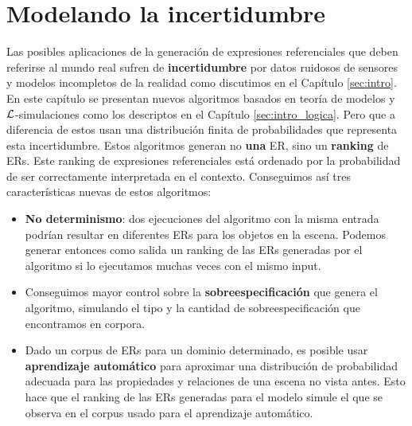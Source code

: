 \chapter{Modelando la incertidumbre}
\label{sec:algoritmo}
 Las posibles aplicaciones de la generaci\'on de expresiones referenciales que deben referirse al mundo real sufren de \textbf{incertidumbre} por datos ruidosos de sensores y modelos incompletos de la realidad como discutimos en el Cap\'itulo \ref{sec:intro}.
En este cap\'itulo se presentan nuevos algoritmos basados en teor\'ia de modelos y $\mathcal{L}$-simulaciones como los descriptos en el Cap\'itulo \ref{sec:intro_logica}. Pero que a diferencia de estos usan una distribuci\'on finita de probabilidades que representa esta incertidumbre. Estos algoritmos generan no \textbf{una} ER, sino un \textbf{ranking} de ERs. Este ranking de expresiones referenciales est\'a ordenado por la probabilidad de ser correctamente interpretada en el contexto. 
Conseguimos as\'i tres caracter\'isticas nuevas de estos algoritmos:
\begin{itemize}
 \item \textbf{No determinismo}: dos ejecuciones del algoritmo con la
misma entrada podr\'{i}an resultar en diferentes ERs para los objetos en la escena. Podemos generar entonces como salida un ranking de las ERs generadas por el algoritmo si lo ejecutamos muchas veces con
el mismo input. 
 \item Conseguimos mayor control sobre la \textbf{sobreespecificaci\'on} que genera el algoritmo, simulando el tipo y la cantidad de sobreespecificaci\'on que encontramos en  corpora.
 \item Dado un corpus de ERs para un dominio determinado,
es posible usar \textbf{aprendizaje autom\'atico} para aproximar una distribuci\'on de probabilidad adecuada para las propiedades y relaciones de una escena no vista antes. Esto hace que el ranking de las ERs generadas para el modelo simule el que se observa en el corpus usado para el aprendizaje autom\'atico.
\end{itemize}

